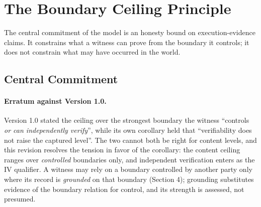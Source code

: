 \documentclass[11pt]{article}
\begin{document}
\section{The Boundary Ceiling Principle}

The central commitment of the model is an honesty bound on execution-evidence claims. It constrains what a witness can prove from the boundary it controls; it does not constrain what may have occurred in the world.
\label{sec:axiom-bc}

\subsection{Central Commitment}

\begingroup
\setlength{\fboxsep}{8pt}
\noindent{}
\endgroup

\paragraph{Erratum against Version 1.0.} Version 1.0 stated the ceiling over the strongest boundary the witness ``controls \emph{or can independently verify}'', while its own corollary held that ``verifiability does not raise the captured level''. The two cannot both be right for content levels, and this revision resolves the tension in favor of the corollary: the content ceiling ranges over \emph{controlled} boundaries only, and independent verification enters as the IV qualifier. A witness may rely on a boundary controlled by another party only where its record is \emph{grounded} on that boundary (Section 4); grounding substitutes evidence of the boundary relation for control, and its strength is assessed, not presumed.
\end{document}
